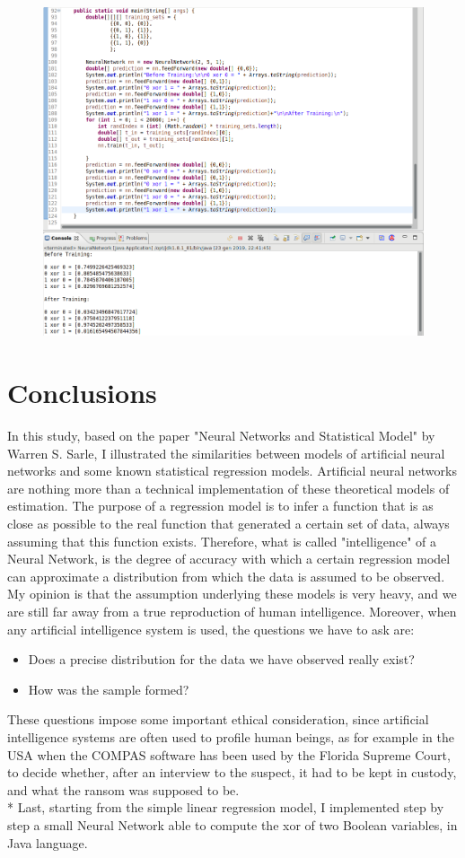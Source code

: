 \documentclass[10pt,a4paper]{article}
\begin{document}
\begin{figure}
	\centering
	\includegraphics[scale=1.91]{img/nn}
	\label{fig:nn}
\end{figure}
\section{Conclusions}
In this study, based on the paper "Neural Networks and Statistical Model" by Warren S. Sarle, I illustrated the similarities between models of artificial neural networks and some known statistical regression models. Artificial neural networks are nothing more than a technical implementation of these theoretical models of estimation. The purpose of a regression model is to infer a function that is as close as possible to the real function that generated a certain set of data, always assuming that this function exists. Therefore, what is called "intelligence" of a Neural Network, is the degree of accuracy with which a certain regression model can approximate a distribution from which the data is assumed to be observed. My opinion is that the assumption underlying these models is very heavy, and we are still far away from a true reproduction of human intelligence. Moreover, when any artificial intelligence system is used, the questions we have to ask are:
\begin{itemize}
	\item Does a precise distribution for the data we have observed really exist?
	\item How was the sample formed?
\end{itemize}
These questions impose some important ethical consideration, since artificial intelligence systems are often used to profile human beings, as for example in the USA when the COMPAS software has been used by the Florida Supreme Court, to decide whether, after an interview to the suspect, it had to be kept in custody, and what the ransom was supposed to be.\\* Last, starting from the simple linear regression model, I implemented step by step a small Neural Network able to compute the xor of two Boolean variables, in Java language.
\end{document}
